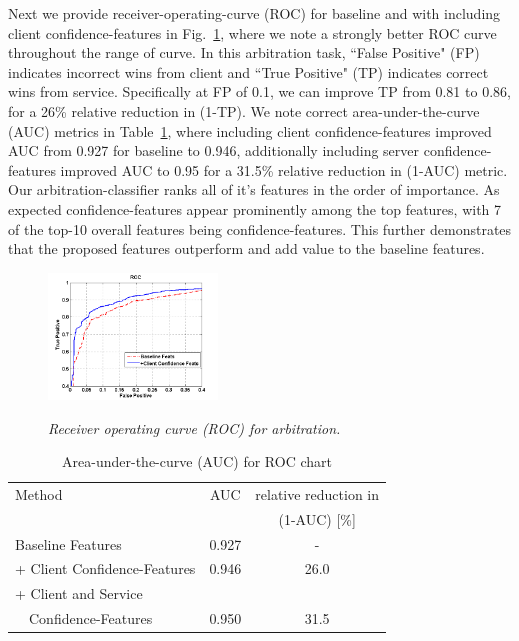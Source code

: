Next we provide receiver-operating-curve (ROC) for baseline and with including client confidence-features in Fig.~\ref{Fig:Baseline-ClientPred-ROC}, where we note a strongly better ROC curve throughout the range of curve. In this arbitration task, ``False Positive" (FP) indicates incorrect wins from client and ``True Positive" (TP) indicates correct wins from service. Specifically at FP of 0.1, we can improve TP from 0.81 to 0.86, for a 26\% relative reduction in (1-TP). We note correct area-under-the-curve (AUC) metrics in Table~\ref{tab:AUC_ROC}, where including client confidence-features improved AUC from 0.927 for baseline to 0.946, additionally including server confidence-features improved AUC to 0.95 for a 31.5\% relative reduction in (1-AUC) metric. Our arbitration-classifier ranks all of it's features in the order of importance. As expected confidence-features appear prominently among the top features, with 7 of the top-10 overall features being confidence-features. This further demonstrates that the proposed features outperform and add value to the baseline features.

\begin{figure}[h]
\centering
{\includegraphics[width=0.4\textwidth]{Baseline-ClientPred-ROC}}
\caption{\it Receiver operating curve (ROC) for arbitration.}
\label{Fig:Baseline-ClientPred-ROC}
\end{figure}

\begin{table}
\begin{center}
\begin{small}
\caption{Area-under-the-curve (AUC) for ROC chart} \label{tab:AUC_ROC}
\begin{tabular}{|l|c|c|}
\hline
Method & AUC & relative reduction in \\
& & (1-AUC) [\%]\\
\hline
Baseline Features & 0.927 & - \\
\hline
+ Client Confidence-Features & 0.946 & 26.0\\
\hline
+ Client and Service & &\\
~~Confidence-Features & 0.950 & 31.5\\
\hline
\end{tabular}
\end{small}
\end{center}
\end{table}
